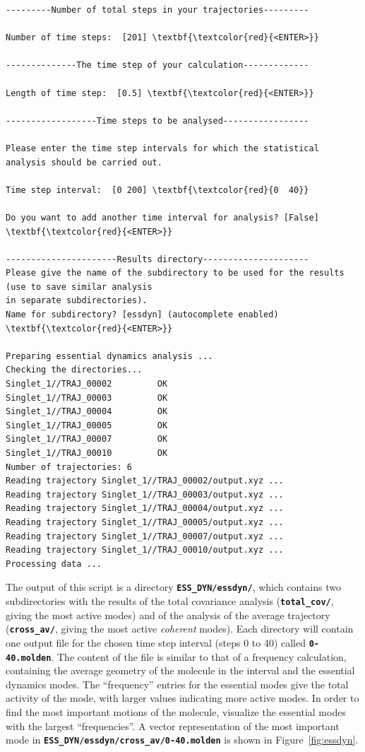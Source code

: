 \documentclass[a4paper,11pt,DIV=15,openany]{scrbook}
\newcommand{\ttt}[1]{\textbf{\texttt{#1}}}
\begin{document}
\begin{oframed}
\begin{Verbatim}[commandchars=\\\{\}]
---------Number of total steps in your trajectories---------

Number of time steps:  [201] \textbf{\textcolor{red}{<ENTER>}}

--------------The time step of your calculation-------------

Length of time step:  [0.5] \textbf{\textcolor{red}{<ENTER>}}

------------------Time steps to be analysed-----------------

Please enter the time step intervals for which the statistical analysis should be carried out. 

Time step interval:  [0 200] \textbf{\textcolor{red}{0  40}}

Do you want to add another time interval for analysis? [False] \textbf{\textcolor{red}{<ENTER>}}

----------------------Results directory---------------------
Please give the name of the subdirectory to be used for the results (use to save similar analysis
in separate subdirectories).
Name for subdirectory? [essdyn] (autocomplete enabled) \textbf{\textcolor{red}{<ENTER>}}

Preparing essential dynamics analysis ...
Checking the directories...
Singlet_1//TRAJ_00002         OK
Singlet_1//TRAJ_00003         OK
Singlet_1//TRAJ_00004         OK
Singlet_1//TRAJ_00005         OK
Singlet_1//TRAJ_00007         OK
Singlet_1//TRAJ_00010         OK
Number of trajectories: 6
Reading trajectory Singlet_1//TRAJ_00002/output.xyz ...
Reading trajectory Singlet_1//TRAJ_00003/output.xyz ...
Reading trajectory Singlet_1//TRAJ_00004/output.xyz ...
Reading trajectory Singlet_1//TRAJ_00005/output.xyz ...
Reading trajectory Singlet_1//TRAJ_00007/output.xyz ...
Reading trajectory Singlet_1//TRAJ_00010/output.xyz ...
Processing data ...
\end{Verbatim}
\end{oframed}

\normalsize
The output of this script is a directory \ttt{ESS\_DYN/essdyn/}, which contains two subdirectories with the results of the total covariance analysis (\ttt{total\_cov/}, giving the most active modes) and of the analysis of the average trajectory (\ttt{cross\_av/}, giving the most active \emph{coherent} modes).
Each directory will contain one output file for the chosen time step interval (steps 0 to 40) called \ttt{0-40.molden}.
The content of the file is similar to that of a frequency calculation, containing the average geometry of the molecule in the interval and the essential dynamics modes.
The ``frequency'' entries for the essential modes give the total activity of the mode, with larger values indicating more active modes.
In order to find the most important motions of the molecule, visualize the essential modes with the largest ``frequencies''.
A vector representation of the most important mode in \ttt{ESS\_DYN/essdyn/cross\_av/0-40.molden} is shown in Figure~\ref{fig:essdyn}.
\end{document}
